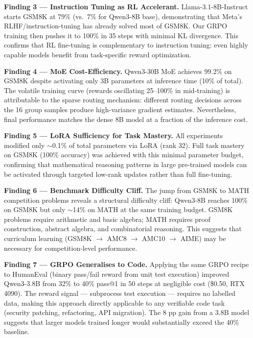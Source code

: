 \documentclass[12pt,a4paper]{report}
\theoremstyle{definition}
\begin{document}
\textbf{Finding 3 --- Instruction Tuning as RL Accelerant.}
Llama-3.1-8B-Instruct starts GSM8K at 79\% (vs.\ 7\% for Qwen3-8B base), demonstrating that Meta's RLHF/instruction-tuning has already solved most of GSM8K. Our GRPO training then pushes it to 100\% in 35 steps with minimal KL divergence. This confirms that RL fine-tuning is complementary to instruction tuning: even highly capable models benefit from task-specific reward optimization.

\textbf{Finding 4 --- MoE Cost-Efficiency.}
Qwen3-30B MoE achieves 99.2\% on GSM8K despite activating only 3B parameters at inference time (10\% of total). The volatile training curve (rewards oscillating 25--100\% in mid-training) is attributable to the sparse routing mechanism: different routing decisions across the 16 group samples produce high-variance gradient estimates. Nevertheless, final performance matches the dense 8B model at a fraction of the inference cost.

\textbf{Finding 5 --- LoRA Sufficiency for Task Mastery.}
All experiments modified only $\sim$0.1\% of total parameters via LoRA (rank 32). Full task mastery on GSM8K (100\% accuracy) was achieved with this minimal parameter budget, confirming that mathematical reasoning patterns in large pre-trained models can be activated through targeted low-rank updates rather than full fine-tuning.

\textbf{Finding 6 --- Benchmark Difficulty Cliff.}
The jump from GSM8K to MATH competition problems reveals a structural difficulty cliff: Qwen3-8B reaches 100\% on GSM8K but only $\sim$14\% on MATH at the same training budget. GSM8K problems require arithmetic and basic algebra; MATH requires proof construction, abstract algebra, and combinatorial reasoning. This suggests that curriculum learning (GSM8K $\rightarrow$ AMC8 $\rightarrow$ AMC10 $\rightarrow$ AIME) may be necessary for competition-level performance.

\textbf{Finding 7 --- GRPO Generalises to Code.}
Applying the same GRPO recipe to HumanEval (binary pass/fail reward from unit test execution) improved Qwen3-3.8B from 32\% to 40\% pass@1 in 50 steps at negligible cost (\$0.50, RTX 4090). The reward signal --- subprocess test execution --- requires no labelled data, making this approach directly applicable to any verifiable code task (security patching, refactoring, API migration). The 8 pp gain from a 3.8B model suggests that larger models trained longer would substantially exceed the 40\% baseline.
\end{document}
